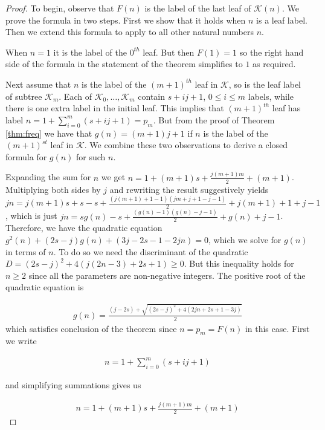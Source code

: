 \documentclass[12pt]{amsart}
\numberwithin{equation}{section}
\numberwithin{theorem}{section}
\numberwithin{table}{section}
\numberwithin{figure}{section}
\begin{document}
\begin{proof}
To begin, observe that $F(n)$ is the label of the last leaf of ${\mathcal K}(n)$. We prove the formula in two steps. First we show that it holds when $n$ is a leaf label. Then we extend this formula to apply to all other natural numbers $n$.

When $n=1$ it is the label of the $0^{th}$ leaf. But then $F(1) = 1$ so the right hand side of the formula in the statement of the theorem simplifies to $1$ as required.

Next assume that $n$ is the label of the $(m+1)^{th}$ leaf in ${\mathcal K}$, so is the leaf label of subtree ${\mathcal K}_m$. Each of ${\mathcal K}_0, \ldots, {\mathcal K}_m$ contain $s+ij+1$, $0\leq i \leq m$ labels, while there is one extra label in the initial leaf. This implies that $(m+1)^{th}$ leaf has label $n=1+\sum_{i=0}^m (s+ij+1) = p_m$. But from the proof of Theorem \ref{thm:freq} we have that $g(n) = (m+1)j+1$ if $n$ is the label of the $(m+1)^{st}$ leaf in ${\mathcal K}$. We combine these two observations to derive a closed formula for $g(n)$ for such $n$.

Expanding the sum for $n$ we get $n = 1+(m+1)s + \frac{j(m+1)m}{2} + (m+1)$. Multiplying both sides by $j$ and rewriting the result suggestively yields $jn = j(m+1)s + s - s + \frac{(j(m+1)+1-1)(jm+j+1-j-1)}{2} + j(m+1) + 1+j-1$, which is just $jn = sg(n) - s + \frac{(g(n)-1)(g(n)-j-1)}{2} + g(n)+j-1$. Therefore, we have the quadratic equation $g^2(n) + (2s-j)g(n) + (3j-2s-1-2jn) = 0$, which we solve for $g(n)$ in terms of $n$. To do so we need the discriminant of the quadratic $D = (2s-j)^2 + 4(j(2n-3)+2s+1) \geq 0$. But this inequality holds for $n \geq 2$ since all the parameters are non-negative integers. The positive root of the quadratic equation is

\begin{align*}
g(n) = \frac{(j-2s) + \sqrt{(2s-j)^2 + 4(2jn + 2s + 1 - 3j)}}{2}
\end{align*}
which satisfies conclusion of the theorem since $n = p_m = F(n)$ in this case.
\iffalse
First we write

\begin{align*}
n = 1+\sum_{i=0}^m(s+ij+1)
\end{align*}

and simplifying summations gives us

\begin{align*}
n = 1+(m+1)s + \frac{j(m+1)m}{2} + (m+1)
\end{align*}


\end{proof}
\end{document}

